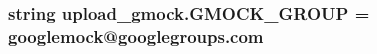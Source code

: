 \subsubsection[{\texorpdfstring{G\+M\+O\+C\+K\+\_\+\+G\+R\+O\+UP}{GMOCK_GROUP}}]{\setlength{\rightskip}{0pt plus 5cm}string upload\+\_\+gmock.\+G\+M\+O\+C\+K\+\_\+\+G\+R\+O\+UP = \textquotesingle{}googlemock@googlegroups.\+com\textquotesingle{}}\hypertarget{namespaceupload__gmock_acf8fe60647d8c3748b0e22dcf669efee}{}\label{namespaceupload__gmock_acf8fe60647d8c3748b0e22dcf669efee}
